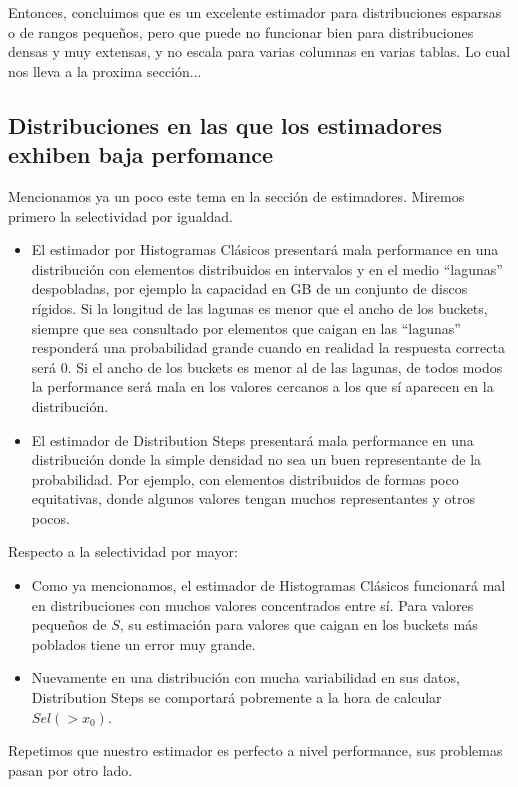 Entonces, concluimos que es un excelente estimador para distribuciones esparsas o de rangos pequeños, pero que puede no funcionar bien para distribuciones densas y muy extensas, y no escala para varias columnas en varias tablas. Lo cual nos lleva a la proxima sección...

\subsection{Distribuciones en las que los estimadores exhiben baja perfomance}
Mencionamos ya un poco este tema en la sección de estimadores. Miremos primero la selectividad por igualdad.
\begin{itemize}
 \item El estimador por Histogramas Clásicos presentará mala performance en una distribución con elementos distribuidos en intervalos y en el medio ``lagunas'' despobladas, por ejemplo la capacidad en GB de un conjunto de discos rígidos. Si la longitud de las lagunas es menor que el ancho de los buckets, siempre que sea consultado por elementos que caigan en las ``lagunas'' responderá una probabilidad grande cuando en realidad la respuesta correcta será 0. Si el ancho de los buckets es menor al de las lagunas, de todos modos la performance será mala en los valores cercanos a los que sí aparecen en la distribución.
 \item El estimador de Distribution Steps presentará mala performance en una distribución donde la simple densidad no sea un buen representante de la probabilidad. Por ejemplo, con elementos distribuidos de formas poco equitativas, donde algunos valores tengan muchos representantes y otros pocos.
\end{itemize}
Respecto a la selectividad por mayor:
\begin{itemize}
 \item Como ya mencionamos, el estimador de Histogramas Clásicos funcionará mal en distribuciones con muchos valores concentrados entre sí. Para valores pequeños de $S$, su estimación para valores que caigan en los buckets más poblados tiene un error muy grande.
 \item Nuevamente en una distribución con mucha variabilidad en sus datos, Distribution Steps se comportará pobremente a la hora de calcular $Sel(>x_0)$.
\end{itemize}
Repetimos que nuestro estimador es perfecto a nivel performance, sus problemas pasan por otro lado.